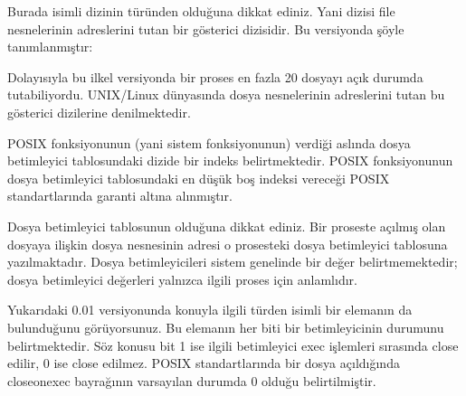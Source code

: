 \documentclass[a4paper,10pt,turkish]{sphinxmanual}
\begin{document}
\sphinxAtStartPar
Burada  isimli dizinin  türünden olduğuna dikkat ediniz. Yani 
dizisi file nesnelerinin adreslerini tutan bir gösterici dizisidir. Bu versiyonda 
şöyle tanımlanmıştır:

\begin{sphinxVerbatim}[commandchars=\\\{\}]
\end{sphinxVerbatim}

\sphinxAtStartPar
Dolayısıyla bu ilkel versiyonda bir proses en fazla 20 dosyayı açık durumda tutabiliyordu.
UNIX/Linux dünyasında dosya nesnelerinin adreslerini tutan bu gösterici dizilerine  denilmektedir.


\sphinxAtStartPar
{} POSIX fonksiyonunun (yani  sistem fonksiyonunun) verdiği  aslında dosya betimleyici tablosundaki dizide bir indeks belirtmektedir.
 POSIX fonksiyonunun dosya betimleyici tablosundaki en düşük boş indeksi vereceği POSIX
standartlarında garanti altına alınmıştır.

\sphinxAtStartPar
Dosya betimleyici tablosunun  olduğuna dikkat ediniz. Bir proseste açılmış olan
dosyaya ilişkin dosya nesnesinin adresi o prosesteki dosya betimleyici tablosuna yazılmaktadır.
Dosya betimleyicileri sistem genelinde bir değer belirtmemektedir; dosya betimleyici değerleri
yalnızca ilgili proses için anlamlıdır.

\sphinxAtStartPar
Yukarıdaki 0.01 versiyonunda konuyla ilgili  türden  isimli bir
elemanın da bulunduğunu görüyorsunuz. Bu elemanın her biti bir betimleyicinin 
durumunu belirtmektedir. Söz konusu bit 1 ise ilgili betimleyici exec işlemleri sırasında close
edilir, 0 ise close edilmez. POSIX standartlarında bir dosya açıldığında close\sphinxhyphen{}on\sphinxhyphen{}exec bayrağının
varsayılan durumda 0 olduğu belirtilmiştir.
\end{document}
